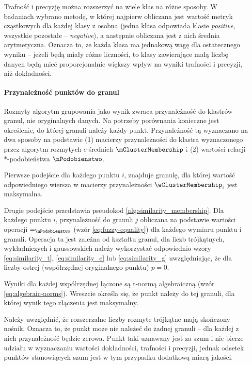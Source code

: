 \documentclass[a4paper,twoside,12pt]{book}
\newcommand{\obcy}[1]{\emph{#1}}
\newcommand{\english}[1]{{\selectlanguage{british}\obcy{#1}}}
\begin{document}
Trafność i precyzję można rozszerzyć na wiele klas na różne sposoby. W badaniach wybrano metodę, w której najpierw obliczana jest wartość metryk cząstkowych dla każdej klasy z osobna (jedna klasa odpowiada klasie \english{positive}, wszystkie pozostałe -- \english{negative}), a następnie obliczana jest z nich średnia arytmetyczna. Oznacza to, że każda klasa ma jednakową wagę dla ostatecznego wyniku -- jeżeli będą miały różne liczności, to klasy zawierające małą liczbę danych będą mieć proporcjonalnie większy wpływ na wyniki trafności i precyzji, niż dokładności.

\paragraph{Przynależność punktów do granul}

Rozmyty algorytm grupowania jako wynik zwraca przynależność do klastrów granul, nie oryginalnych danych. Na potrzeby porównania konieczne jest określenie, do której granuli należy każdy punkt. Przynależność tą wyznaczano na dwa sposoby na podstawie
(1)  macierzy przynależności do klastra wyznaczonego przez algorytm rozmytych $c$-średnich $\mClusterMembership$ i 
(2)  wartości relacji $\ast$-podobieństwa $\nPodobienstwo$.

Pierwsze podejście dla każdego punktu $i$, znajduje granulę, dla której wartość odpowiedniego wiersza w macierzy przynależności $\wClusterMembership_i$ jest maksymalna.

Drugie podejście przedstawia pseudokod \ref{alg:similarity_membership}.
Dla każdego punktu $i$, przynależność do granuli $j$ obliczana na podstawie wartości operacji $=_\nPodobienstwo$ (wzór \ref{eq:fuzzy-equality}) dla każdego wymiaru punktu i granuli. Operacja ta jest zależna od kształtu granul, dla liczb trójkątnych, wykładniczych i gaussowskich należy wykorzystać odpowiednio wzory \ref{eq:similarity_t}, \ref{eq:similarity_e} lub \ref{eq:similarity_g} uwzględniając, że dla liczby ostrej (współrzędnej oryginalnego punktu) $p = 0$. 

Wyniki dla każdej współrzędnej łączone są t-normą algebraiczną (wzór \ref{eq:algebraic-norms}). Wreszcie określa się, że punkt należy do tej granuli, dla której wynik tego złączenia jest maksymalny.

Należy uwzględnić, że rozszerzalne liczby rozmyte trójkątne mają skończony nośnik. Oznacza to, że punkt może nie należeć do żadnej granuli -- dla każdej z nich przynależność będzie zerowa. Punkt taki uznawany jest za szum i nie bierze udziału w wyznaczaniu wartości dokładności, trafności i precyzji, jednak odsetek punktów stanowiących szum jest w tym przypadku dodatkową miarą jakości.
\end{document}
